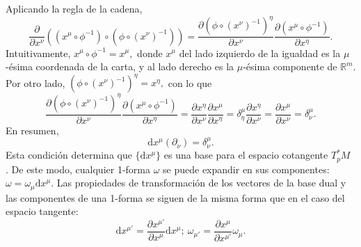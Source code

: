 Aplicando la regla de la cadena,
$$\frac{\partial}{\partial x^\nu}((x^\mu\circ\phi^{-1})\circ(\phi\circ (x^\nu)^{-1}))=\frac{\partial(\phi\circ(x^\nu)^{-1})^\eta}{\partial x^\nu}\frac{\partial(x^\mu\circ\phi^{-1})}{\partial x^\eta}.$$
Intuitivamente, $x^\mu\circ\phi^{-1}=x^\mu,$ donde $x^\mu$ del lado izquierdo de la igualdad es la $\mu$-ésima coordenada de la carta, y al lado derecho es la $\mu$-ésima componente de $\mathbb{R}^m$. Por otro lado, $(\phi\circ(x^\nu)^{-1})^\eta=x^\eta,$ con lo que
$$\frac{\partial(\phi\circ(x^\nu)^{-1})^\eta}{\partial x^\nu}\frac{\partial(x^\mu\circ\phi^{-1})}{\partial x^\eta}=\frac{\partial x^\eta}{\partial x^\nu}\frac{\partial x^\mu}{\partial x^\eta}=\delta_\eta^\mu \frac{\partial x^\eta}{\partial x^\nu}=\frac{\partial x^\mu}{\partial x^\nu}=\delta_\nu^\mu.$$
En resumen,
\begin{equation}
	\boxed{\mathrm{d}x^\mu(\partial_\nu)=\delta_\nu^\mu.}
\end{equation}
Esta condición determina que $\{\mathrm{d}x^\mu\}$ es una base para el espacio cotangente $T^*_p M$ \cite{Carroll}. De este modo, cualquier 1-forma $\omega$ se puede expandir en sus componentes: $\omega=\omega_\mu \mathrm{d}x^\mu$. Las propiedades de transformación de los vectores de la base dual y las componentes de una 1-forma se siguen de la misma forma que en el caso del espacio tangente:
$$\mathrm{d}x^{\mu'}=\frac{\partial x^{\mu'}}{\partial x^\mu} \mathrm{d}x^\mu;\ \omega_{\mu'}=\frac{\partial x^\mu}{\partial x^{\mu'}}\omega_\mu.$$

